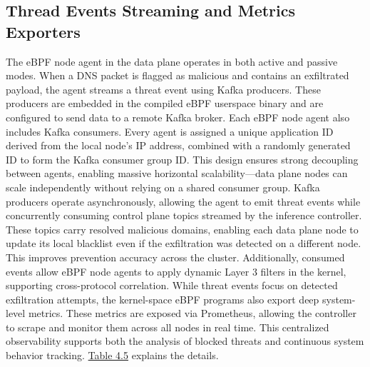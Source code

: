 \documentclass [11pt, proquest] {uwthesis}[2020/02/24]
\begin{document}
\subsection{Thread Events Streaming and Metrics Exporters}
The eBPF node agent in the data plane operates in both active and passive modes. When a DNS packet is flagged as malicious and contains an exfiltrated payload, the agent streams a threat event using Kafka producers. These producers are embedded in the compiled eBPF userspace binary and are configured to send data to a remote Kafka broker. Each eBPF node agent also includes Kafka consumers. Every agent is assigned a unique application ID derived from the local node’s IP address, combined with a randomly generated ID to form the Kafka consumer group ID. This design ensures strong decoupling between agents, enabling massive horizontal scalability—data plane nodes can scale independently without relying on a shared consumer group. Kafka producers operate asynchronously, allowing the agent to emit threat events while concurrently consuming control plane topics streamed by the inference controller. These topics carry resolved malicious domains, enabling each data plane node to update its local blacklist even if the exfiltration was detected on a different node. This improves prevention accuracy across the cluster. Additionally, consumed events allow eBPF node agents to apply dynamic Layer 3 filters in the kernel, supporting cross-protocol correlation. While threat events focus on detected exfiltration attempts, the kernel-space eBPF programs also export deep system-level metrics. These metrics are exposed via Prometheus, allowing the controller to scrape and monitor them across all nodes in real time. This centralized observability supports both the analysis of blocked threats and continuous system behavior tracking.   \hyperref[tab:kafka-topics]{Table 4.5} explains the details.
\end{document}

